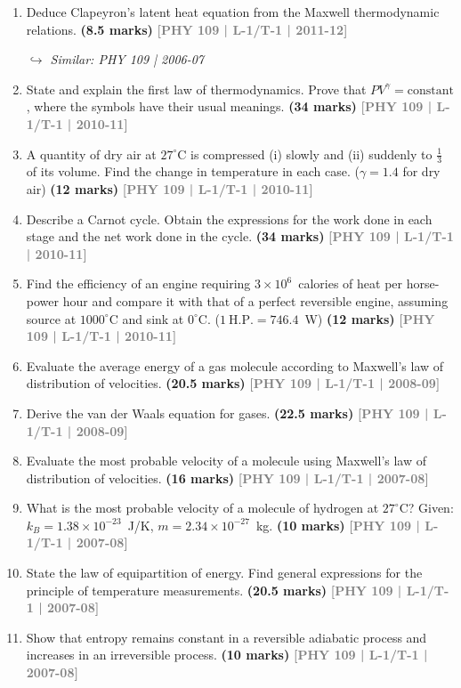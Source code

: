 \documentclass[12pt,a3paper]{article}
\newcommand{\yr}[1]{\hfill\textcolor{gray}{\small\textbf{[#1]}}}
\newcommand{\mk}[1]{\textcolor{orange!70!black}{\small\textbf{(#1 marks)}}}
\newcommand{\variant}[1]{\par\vspace{1pt}\textcolor{blue!50!black}%
  {\footnotesize\textit{$\hookrightarrow$ Similar: #1}}}
\begin{document}
\begin{enumerate}
\item Deduce Clapeyron's latent heat equation from the Maxwell thermodynamic relations.
\mk{8.5} \yr{PHY 109 | L-1/T-1 | 2011-12}
\variant{PHY 109 | 2006-07}

\item State and explain the first law of thermodynamics. Prove that $PV^\gamma = \text{constant}$, where the symbols have their usual meanings.
\mk{34} \yr{PHY 109 | L-1/T-1 | 2010-11}

\item A quantity of dry air at $27^\circ$C is compressed (i) slowly and (ii) suddenly to $\frac{1}{3}$ of its volume. Find the change in temperature in each case. ($\gamma = 1.4$ for dry air)
\mk{12} \yr{PHY 109 | L-1/T-1 | 2010-11}

\item Describe a Carnot cycle. Obtain the expressions for the work done in each stage and the net work done in the cycle.
\mk{34} \yr{PHY 109 | L-1/T-1 | 2010-11}

\item Find the efficiency of an engine requiring $3\times10^6$~calories of heat per horse-power hour and compare it with that of a perfect reversible engine, assuming source at $1000^\circ$C and sink at $0^\circ$C. ($1\ \text{H.P.} = 746.4$~W)
\mk{12} \yr{PHY 109 | L-1/T-1 | 2010-11}

\item Evaluate the average energy of a gas molecule according to Maxwell's law of distribution of velocities.
\mk{20.5} \yr{PHY 109 | L-1/T-1 | 2008-09}

\item Derive the van der Waals equation for gases.
\mk{22.5} \yr{PHY 109 | L-1/T-1 | 2008-09}

\item Evaluate the most probable velocity of a molecule using Maxwell's law of distribution of velocities.
\mk{16} \yr{PHY 109 | L-1/T-1 | 2007-08}

\item What is the most probable velocity of a molecule of hydrogen at $27^\circ$C? Given: $k_B = 1.38\times10^{-23}$~J/K, $m = 2.34\times10^{-27}$~kg.
\mk{10} \yr{PHY 109 | L-1/T-1 | 2007-08}

\item State the law of equipartition of energy. Find general expressions for the principle of temperature measurements.
\mk{20.5} \yr{PHY 109 | L-1/T-1 | 2007-08}

\item Show that entropy remains constant in a reversible adiabatic process and increases in an irreversible process.
\mk{10} \yr{PHY 109 | L-1/T-1 | 2007-08}


\end{enumerate}
\end{document}
